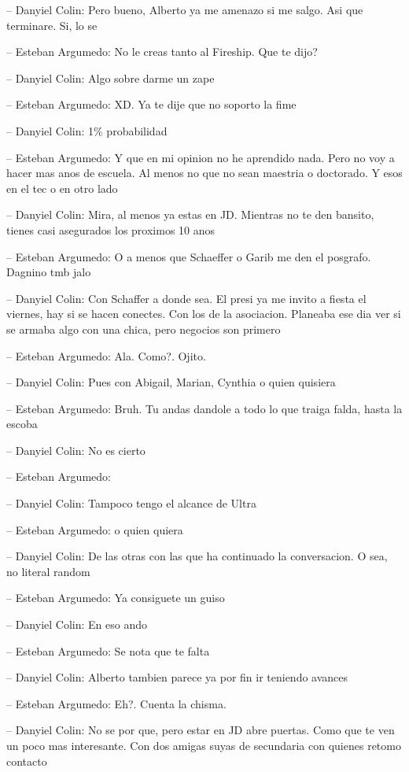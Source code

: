 -- Danyiel Colin: Pero bueno, Alberto ya me amenazo si me salgo. Asi que
terminare. Si, lo se

-- Esteban Argumedo: No le creas tanto al Fireship. Que te dijo?

-- Danyiel Colin: Algo sobre darme un zape

-- Esteban Argumedo: XD. Ya te dije que no soporto la fime

-- Danyiel Colin: 1\% probabilidad

-- Esteban Argumedo: Y que en mi opinion no he aprendido nada. Pero no
voy a hacer mas anos de escuela. Al menos no que no sean maestria o
doctorado. Y esos en el tec o en otro lado

-- Danyiel Colin: Mira, al menos ya estas en JD. Mientras no te den
bansito, tienes casi asegurados los proximos 10 anos

-- Esteban Argumedo: O a menos que Schaeffer o Garib me den el posgrafo.
Dagnino tmb jalo

-- Danyiel Colin: Con Schaffer a donde sea. El presi ya me invito a
fiesta el viernes, hay si se hacen conectes. Con los de la asociacion.
Planeaba ese dia ver si se armaba algo con una chica, pero negocios son
primero

-- Esteban Argumedo: Ala. Como?. Ojito.

-- Danyiel Colin: Pues con Abigail, Marian, Cynthia o quien quisiera

-- Esteban Argumedo: Bruh. Tu andas dandole a todo lo que traiga falda,
hasta la escoba

-- Danyiel Colin: No es cierto

-- Esteban Argumedo:

-- Danyiel Colin: Tampoco tengo el alcance de Ultra

-- Esteban Argumedo: o quien quiera

-- Danyiel Colin: De las otras con las que ha continuado la
conversacion. O sea, no literal random

-- Esteban Argumedo: Ya consiguete un guiso

-- Danyiel Colin: En eso ando

-- Esteban Argumedo: Se nota que te falta

-- Danyiel Colin: Alberto tambien parece ya por fin ir teniendo avances

-- Esteban Argumedo: Eh?. Cuenta la chisma.

-- Danyiel Colin: No se por que, pero estar en JD abre puertas. Como que
te ven un poco mas interesante. Con dos amigas suyas de secundaria con
quienes retomo contacto

